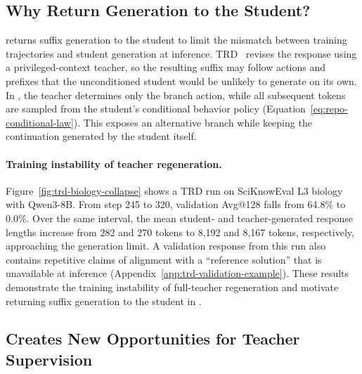 \subsection{Why Return Generation to the Student?}
\label{sec:method-student-generation}

\method{} returns suffix generation to the student to limit the mismatch between training trajectories and student generation at inference. TRD~\citep{jiang2026trajectory} revises the response using a privileged-context teacher, so the resulting suffix may follow actions and prefixes that the unconditioned student would be unlikely to generate on its own. In \method{}, the teacher determines only the branch action, while all subsequent tokens are sampled from the student's conditional behavior policy (Equation~\ref{eq:repo-conditional-law}). This exposes an alternative branch while keeping the continuation generated by the student itself.



\vspace{-0.1cm}\paragraph{Training instability of teacher regeneration.}
Figure~\ref{fig:trd-biology-collapse} shows a TRD run on SciKnowEval L3 biology with Qwen3-8B. From step 245 to 320, validation Avg@128 falls from 64.8\% to 0.0\%. Over the same interval, the mean student- and teacher-generated response lengths increase from 282 and 270 tokens to 8,192 and 8,167 tokens, respectively, approaching the generation limit. A validation response from this run also contains repetitive claims of alignment with a ``reference solution'' that is unavailable at inference (Appendix~\ref{app:trd-validation-example}). These results demonstrate the training instability of full-teacher regeneration and motivate returning suffix generation to the student in \method{}.

\subsection{\method{} Creates New Opportunities for Teacher Supervision}
\label{sec:method-collection-bottleneck}


